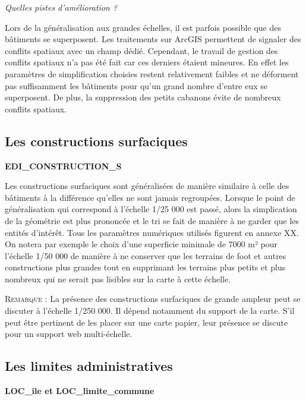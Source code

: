 \begin{center}
    \textit{Quelles pistes d'amélioration ?}
\end{center}

Lors de la généralisation aux grandes échelles, il est parfois possible que des bâtiments se superposent. Les traitements sur ArcGIS permettent de signaler des conflits spatiaux avec un champ dédié. Cependant, le travail de gestion des conflits spatiaux n'a pas été fait car ces derniers étaient mineures. En effet les paramètres de simplification choisies restent relativement faibles et ne déforment pas suffisamment les bâtiments pour qu'un grand nombre d'entre eux se superposent. De plus, la suppression des petits cabanons évite de nombreux conflits spatiaux.

\subsection{Les constructions surfaciques}
\begin{center}
    \footnotesize
    \textbf{EDI\_CONSTRUCTION\_S}
\end{center}

Les constructions surfaciques sont généralisées de manière similaire à celle des bâtiments à la différence qu'elles ne sont jamais regroupées. Lorsque le point de généralisation qui correspond à l'échelle 1/25 000 est passé, alors la simplication de la géométrie est plus prononcée et le tri se fait de manière à ne garder que les entités d'intérêt. Tous les paramètres numériques utilisés figurent en annexe XX. On notera par exemple le choix d'une superficie minimale de 7000 m² pour l'échelle 1/50 000 de manière à ne conserver que les terrains de foot et autres constructions plus grandes tout en supprimant les terrains plus petits et plus nombreux qui ne serait pas lisibles sur la carte à cette échelle.

\textsc{Remarque :}
La présence des constructions surfaciques de grande ampleur peut se discuter à l'échelle 1/250 000. Il dépend notamment du support de la carte. S'il peut être pertinent de les placer sur une carte papier, leur présence se discute pour un support web multi-échelle. 

\subsection{Les limites administratives}

\begin{center}
    \footnotesize
    \textbf{LOC\_ile et LOC\_limite\_commune}
\end{center}

